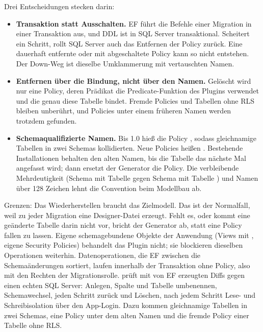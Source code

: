 Drei Entscheidungen stecken darin:

\begin{itemize}
  \item \textbf{Transaktion statt Ausschalten.} EF führt die Befehle einer Migration in einer
    Transaktion aus, und DDL ist in SQL Server transaktional. Scheitert ein Schritt, rollt
    SQL Server auch das Entfernen der Policy zurück. Eine dauerhaft entfernte oder mit
     abgeschaltete Policy kann so nicht entstehen. Der Down-Weg ist dieselbe
    Umklammerung mit vertauschten Namen.
  \item \textbf{Entfernen über die Bindung, nicht über den Namen.} Gelöscht wird nur eine
    Policy, deren Prädikat die Predicate-Funktion des Plugins verwendet und die genau diese
    Tabelle bindet. Fremde Policies und Tabellen ohne RLS bleiben unberührt, und Policies
    unter einem früheren Namen werden trotzdem gefunden.
  \item \textbf{Schemaqualifizierte Namen.} Bis 1.0 hieß die Policy
    , sodass gleichnamige Tabellen in zwei Schemas
    kollidierten. Neue Policies heißen .
    Bestehende Installationen behalten den alten Namen, bis die Tabelle das nächste Mal
    angefasst wird; dann ersetzt der Generator die Policy. Die verbleibende Mehrdeutigkeit
    (Schema  mit Tabelle  gegen Schema  mit Tabelle
    ) und Namen über 128 Zeichen lehnt die Convention beim Modellbau ab.
\end{itemize}

Grenzen: Das Wiederherstellen braucht das Zielmodell. Das ist der Normalfall, weil
 zu jeder Migration eine Designer-Datei erzeugt. Fehlt es,
oder kommt eine geänderte Tabelle darin nicht vor, bricht der Generator ab, statt eine Policy
fallen zu lassen. Eigene schemagebundene Objekte der Anwendung (Views mit
, eigene Security Policies) behandelt das Plugin nicht; sie blockieren
dieselben Operationen weiterhin. Datenoperationen, die EF zwischen die Schemaänderungen
sortiert, laufen innerhalb der Transaktion ohne Policy, also mit den Rechten der
Migrationsrolle.  prüft
mit von EF erzeugten Diffs gegen einen echten SQL Server: Anlegen, Spalte und Tabelle
umbenennen, Schemawechsel, jeden Schritt zurück und Löschen, nach jedem Schritt Lese- und
Schreibisolation über den App-Login. Dazu kommen gleichnamige Tabellen in zwei Schemas, eine
Policy unter dem alten Namen und die fremde Policy einer Tabelle ohne RLS.

